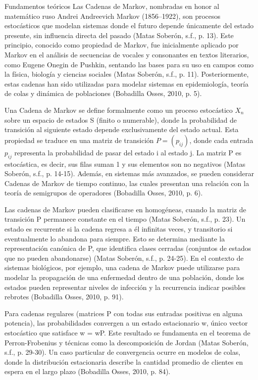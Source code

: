 
Fundamentos teóricos Las Cadenas de Markov, nombradas en honor al matemático ruso Andrei Andreevich Markov (1856–1922), son procesos estocásticos que modelan sistemas donde el futuro depende únicamente del estado presente, sin influencia directa del pasado (Matas Soberón, s.f., p. 13). Este principio, conocido como propiedad de Markov, fue inicialmente aplicado por Markov en el análisis de secuencias de vocales y consonantes en textos literarios, como Eugene Onegin de Pushkin, sentando las bases para su uso en campos como la física, biología y ciencias sociales (Matas Soberón, s.f., p. 11). Posteriormente, estas cadenas han sido utilizadas para modelar sistemas en epidemiología, teoría de colas y dinámica de poblaciones (Bobadilla Osses, 2010, p. 5).

Una Cadena de Markov se define formalmente como un proceso estocástico ${X_n}$ sobre un espacio de estados S (finito o numerable), donde la probabilidad de transición al siguiente estado depende exclusivamente del estado actual. Esta propiedad se traduce en una matriz de transición $P = (p_{ij})$, donde cada entrada $p_{ij}$ representa la probabilidad de pasar del estado i al estado j. La matriz P es estocástica, es decir, sus filas suman 1 y sus elementos son no negativos (Matas Soberón, s.f., p. 14-15). Además, en sistemas más avanzados, se pueden considerar Cadenas de Markov de tiempo continuo, las cuales presentan una relación con la teoría de semigrupos de operadores (Bobadilla Osses, 2010, p. 6).

Las cadenas de Markov pueden clasificarse en homogéneas, cuando la matriz de transición P permanece constante en el tiempo (Matas Soberón, s.f., p. 23). Un estado es recurrente si la cadena regresa a él infinitas veces, y transitorio si eventualmente lo abandona para siempre. Esto se determina mediante la representación canónica de P, que identifica clases cerradas (conjuntos de estados que no pueden abandonarse) (Matas Soberón, s.f., p. 24-25). En el contexto de sistemas biológicos, por ejemplo, una cadena de Markov puede utilizarse para modelar la propagación de una enfermedad dentro de una población, donde los estados pueden representar niveles de infección y la recurrencia indicar posibles rebrotes (Bobadilla Osses, 2010, p. 91).

Para cadenas regulares (matrices P con todas sus entradas positivas en alguna potencia), las probabilidades convergen a un estado estacionario w, único vector estocástico que satisface w = wP. Este resultado se fundamenta en el teorema de Perron-Frobenius y técnicas como la descomposición de Jordan (Matas Soberón, s.f., p. 29-30). Un caso particular de convergencia ocurre en modelos de colas, donde la distribución estacionaria describe la cantidad promedio de clientes en espera en el largo plazo (Bobadilla Osses, 2010, p. 84).

